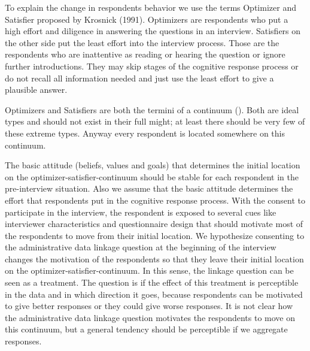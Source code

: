 To explain the change in respondents behavior we use the terms Optimizer and Satisfier proposed by Krosnick (1991). Optimizers are respondents who put a high effort and diligence in answering the questions in an interview. Satisfiers on the other side put the least effort into the interview process. Those are the respondents who are inattentive as reading or hearing the question or ignore further introductions. They may skip stages of the cognitive response process or do not recall all information needed and just use the least effort to give a plausible answer.

Optimizers and Satisfiers are both the termini of a continuum (\cite{Krosnick99}). Both are ideal types and should not exist in their full might; at least there should be very few of these extreme types. Anyway every respondent is located somewhere on this continuum.

The basic attitude (beliefs, values and goals) that determines the initial location on the optimizer-satisfier-continuum should be stable for each respondent in the pre-interview situation. Also we assume that the basic attitude determines the effort that respondents put in the cognitive response process. With the consent to participate in the interview, the respondent is exposed to several cues like interviewer characteristics and questionnaire design that should motivate most of the respondents to move from their initial location. We hypothesize consenting to the administrative data linkage question at the beginning of the interview changes the motivation of the respondents so that they leave their initial location on the optimizer-satisfier-continuum. In this sense, the linkage question can be seen as a treatment. The question is if the effect of this treatment is perceptible in the data and in which direction it goes, because respondents can be motivated to give better responses or they could give worse responses. It is not clear how the administrative data linkage question motivates the respondents to move on this continuum, but a general tendency should be perceptible if we aggregate responses.

